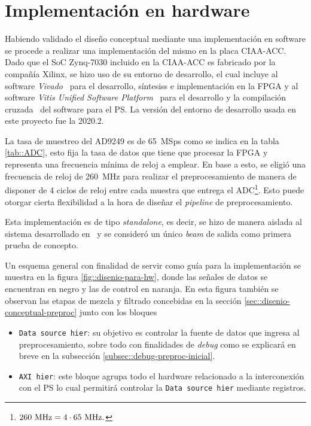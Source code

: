 \documentclass[../../main.tex]{subfiles}
\begin{document}
\section{Implementación en hardware}
Habiendo validado el diseño conceptual mediante una implementación en software se procede a realizar una implementación del mismo en la placa CIAA-ACC. Dado que el SoC Zynq-7030 incluido en la CIAA-ACC es fabricado por la compañía Xilinx, se hizo uso de su entorno de desarrollo, el cual incluye al software \textit{Vivado}~\cite{vivado} para el desarrollo, síntesiss e implementación en la FPGA y al software \textit{Vitis Unified Software Platform}~\cite{vitis} para el desarrollo y la compilación cruzada~\cite{cross-compilation} del software para el PS. La versión del entorno de desarrollo usada en este proyecto fue la 2020.2.

La tasa de muestreo del AD9249 es de 65~MSps como se indica en la tabla \ref{tab::ADC}, esto fija la tasa de datos que tiene que procesar la FPGA y representa una frecuencia mínima de reloj a emplear. En base a esto, se eligió una frecuencia de reloj de 260~MHz para realizar el preprocesamiento de manera de disponer de 4 ciclos de reloj entre cada muestra que entrega el ADC\footnote{$260~\textrm{MHz} = 4 \cdot 65~\textrm{MHz}.$}. Esto puede otorgar cierta flexibilidad a la hora de diseñar el \textit{pipeline} de preprocesamiento.

Esta implementación es de tipo \textit{standalone}, es decir, se hizo de manera aislada al sistema desarrollado en~\cite{proyecto-jose} y se consideró un único \textit{beam} de salida como primera prueba de concepto.

Un esquema general con finalidad de servir como guía para la implementación se muestra en la figura \ref{fig::disenio-para-hw}, donde las señales de datos se encuentran en negro y las de control en naranja. En esta figura también se observan las etapas de mezcla y filtrado concebidas en la sección \ref{sec::disenio-conceptual-preproc} junto con los bloques
\begin{itemize}
    \item \texttt{Data source hier}: su objetivo es controlar la fuente de datos que ingresa al preprocesamiento, sobre todo con finalidades de \textit{debug} como se explicará en breve en la subsección \ref{subsec::debug-preproc-inicial}.
    \item \texttt{AXI hier}: este bloque agrupa todo el hardware relacionado a la interconexión con el PS lo cual permitirá controlar la \texttt{Data source hier} mediante registros.
\end{itemize}
\end{document}
